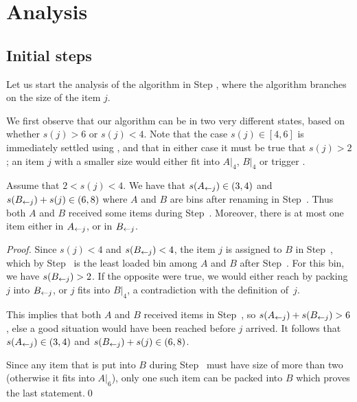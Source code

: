 \section{Analysis}

\subsection{Initial steps}
Let us start the analysis of the algorithm \tbalg in Step
, where the algorithm branches on the size of the item
$j$.

\smallskip
We first observe that our algorithm can be in two very different
states, based on whether $s(j) > 6$ or $s(j) < 4$. Note that the case
$s(j) \in [4,6]$ is immediately settled using , and that in either
case it must be true that $s(j) > 2$; an item $j$ with a smaller size
would either fit into $A|_4$, $B|_4$ or trigger .

\begin{obs}
\label{obs:1a}
Assume that $2 < s(j) <4$. We have that $s(A_{\leftarrow j}) \in (3,4)$
and $s(B_{\leftarrow j}) + s(j) \in(6,8)$
where $A$ and $B$ are bins after renaming in Step~{\rm {}}.
Thus both $A$ and $B$ received some items during Step~{\rm {}}.
Moreover, there is at most one item either in $A_{\leftarrow j}$, or in $B_{\leftarrow j}$.
\end{obs}

\begin{proof}
Since $s(j)<4$ and $s(B_{\leftarrow j})<4$, 
the item $j$ is assigned to $B$ in Step~, which by Step~ is
the least loaded bin among $A$ and $B$ after Step~.
For this bin, we have $s(B_{\leftarrow j}) > 2$. If the opposite were
true, we would either reach  by packing $j$ into $B_{\leftarrow j}$,
or $j$ fits into $B|_4$, a contradiction with the definition of~$j$.

This implies that both $A$ and $B$ received items in Step~, so $s(A_{\leftarrow j})+s(B_{\leftarrow j})>6$,
else a good situation would have been reached before $j$ arrived.
It follows that $s(A_{\leftarrow j})\in(3,4)$ and $s(B_{\leftarrow j}) + s(j) \in (6,8)$.

Since any item that is put into $B$ during Step~ must have size
of more than two (otherwise it fits into $A|_6$), only one such item can be packed into $B$
which proves the last statement.\qed
\end{proof}

